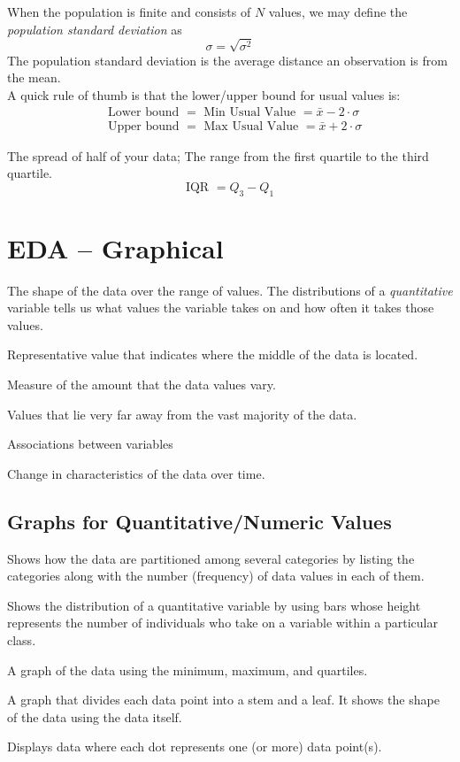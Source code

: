\documentclass[]{article}
\newenvironment{definitions}{
	\begin{description}[font=\sffamily\bfseries, leftmargin=1cm, style=nextline]
	}{
	\end{description}
}
\begin{document}
\begin{definitions}
			\item[Standard Deviation]
			When the population is finite and consists of $N$ values, we may define the \textit{population standard deviation} as
			\[\sigma = \sqrt{\sigma^2}\]
			The population standard deviation is the average distance an observation is from the mean.\\
			A quick rule of thumb is that the lower/upper bound for usual values is:
			\begin{align*}
				&\text{Lower bound } = \text{ Min Usual Value } = \bar{x} - 2\cdot \sigma\\
				&\text{Upper bound } = \text { Max Usual Value } = \bar{x} + 2\cdot \sigma
			\end{align*}
			\item[Interquartile Range (IQR)]
			The spread of half of your data; The range from the first quartile to the third quartile.
			\[ \text{IQR } = Q_3 - Q_1\]
		\end{definitions}
	\section{EDA -- Graphical}
	\begin{definitions}
		\item[Distribution]
		The shape of the data over the range of values. The distributions of a \textit{quantitative} variable tells us what values the variable takes on and how often it takes those values.
		\item[Center]
		Representative value that indicates where the middle of the data is located.
		\item[Variation]
		Measure of the amount that the data values vary.
		\item[Outliers]
		Values that lie very far away from the vast majority of the data.
		\item[Relationships]
		Associations between variables
		\item[Trends]
		Change in characteristics of the data over time.
	\end{definitions}
	\subsection{Graphs for Quantitative/Numeric Values}
	\begin{definitions}
		\item[Frequency Tables or Distributions]
		Shows how the data are partitioned among several categories by listing the categories along with the number (frequency) of data values in each of them.
		\item[Histograms]
		Shows the distribution of a quantitative variable by using bars whose height represents the number of individuals who take on a variable within a particular class.
		\item[Boxplots]
		A graph of the data using the minimum, maximum, and quartiles.
		\item[Stem and Leaf Plots]
		A graph that divides each data point into a stem and a leaf. It shows the shape of the data using the data itself.
		\item[Dot Plots]
		Displays data where each dot represents one (or more) data point(s).
	\end{definitions}
\end{document}
